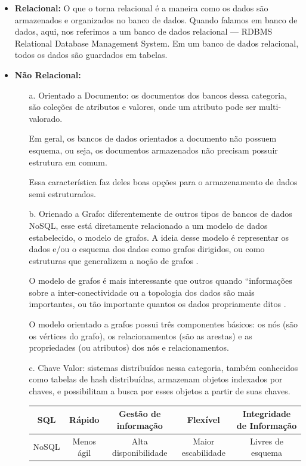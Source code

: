 \documentclass[12pt,a4paper,onecolumn]{article}
\begin{document}
\begin{itemize}
	\item\textbf{Relacional:} O que o torna relacional é a maneira como os dados são armazenados e organizados no banco de dados. Quando falamos em banco de dados, aqui, nos referimos a um banco de dados relacional — RDBMS Relational Database Management System. Em um banco de dados relacional, todos os dados são guardados em tabelas.
	\item\textbf{Não Relacional:}

	
\begin{itemize}
		\item[a.] Orientado a Documento: os documentos dos bancos dessa categoria, são coleções de atributos e valores, onde um atributo pode ser multi-valorado.
		
		Em geral, os bancos de dados orientados a documento não possuem esquema, ou seja, os documentos armazenados não precisam possuir estrutura em comum.
		
		Essa característica faz deles boas opções para o armazenamento de dados semi estruturados.
		\item[b.] Orienado a Grafo: diferentemente de outros tipos de bancos de dados NoSQL, esse está diretamente relacionado a um modelo de dados estabelecido, o modelo de grafos. A ideia desse modelo é representar os dados e/ou o esquema dos dados como grafos dirigidos, ou como estruturas que generalizem a noção de grafos .
		
		O modelo de grafos é mais interessante que outros quando “informações sobre a inter-conectividade ou a topologia dos dados são mais importantes, ou tão importante quantos os dados propriamente ditos .
		
		O modelo orientado a grafos possui três componentes básicos: os nós (são os vértices do grafo), os relacionamentos (são as arestas) e as propriedades (ou atributos) dos nós e relacionamentos.
		
		
		\item[c.] Chave Valor: sistemas distribuídos nessa categoria, também conhecidos como tabelas de hash distribuídas, armazenam objetos indexados por chaves, e possibilitam a busca por esses objetos a partir de suas chaves.\\
		
		
		\begin{tabular}{|c|c|c|c|c|}
		\hline SQL & Rápido & Gestão de informação & Flexível & Integridade de Informação \\
		\hline NoSQL & Menos ágil & Alta disponibilidade & Maior escabilidade & Livres de esquema \\
		\hline 
		\end{tabular} 
		
		
		
\end{itemize}	
\end{itemize}	
	
\end{document}
